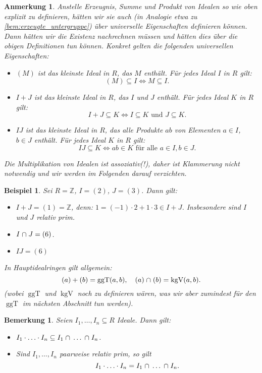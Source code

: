 \documentclass[a4paper, twoside, 11pt, ngerman]{report}
\newcommand{\ZZ}{\mathds Z}
\DeclareMathOperator{\ggT}{ggT}
\DeclareMathOperator{\kgV}{kgV}
\renewcommand{\cap}{\;\rotatebox{90}{\reflectbox{\rotatebox{270}{$\cup$}}}\;}
\theoremstyle{definistyle}
\newtheorem{bem}[satz]{Bemerkung}
\newtheorem{anm}[satz]{Anmerkung}
\newtheorem{bsp}[satz]{Beispiel}
\theoremstyle{remark}
\begin{document}
\begin{anm}\label{anm:kleinstes_ideal}
Anstelle Erzeugnis, Summe und Produkt von Idealen so wie oben explizit zu definieren,
hätten wir sie auch (in Analogie etwa zu \ref{bem:erzeugte_untergruppe}) über universelle Eigenschaften definieren können. Dann hätten wir die Existenz nachrechnen müssen und hätten dies
über die obigen Definitionen tun können. Konkret gelten die folgenden universellen Eigenschaften:
\begin{itemize}
    \item $(M)$ ist das kleinste Ideal in $R$, das $M$ enthält. Für jedes Ideal $I$ in $R$ gilt:
    \[(M) \subseteq I \iff M \subseteq I.\]
    \item $I + J$ ist das kleinste Ideal in $R$, das $I$ und $J$ enthält. Für jedes Ideal $K$ in $R$ gilt:
    \[I + J \subseteq K \iff I \subseteq K \text{ und } J \subseteq K.\]
    \item $I J$ ist das kleinste Ideal in $R$, das alle Produkte $ab$ von Elementen $a \in I$, $b \in J$ enthält.
    Für jedes Ideal $K$ in $R$ gilt:
    \[
    I J \subseteq K \iff ab \in K \text{ für alle } a \in I, b \in J.
    \]
\end{itemize}
Die Multiplikation von Idealen ist assoziativ(!), daher ist Klammerung nicht notwendig und wir werden im Folgenden darauf verzichten.
\end{anm}

\begin{bsp}\label{bsp:idealsummen_produkte}
Sei $R = \ZZ$, $I = (2)$, $J = (3)$. Dann gilt:
\begin{itemize}
    \item $I + J = (1) = \ZZ$, denn: $1 = (-1) \cdot 2 + 1 \cdot 3 \in I + J$. Insbesondere sind $I$ und $J$ relativ prim.
    \item $I \cap J = (6)$.
    \item $IJ=(6)$
\end{itemize}

In Hauptidealringen gilt allgemein:
\[
(a) + (b) = \ggT(a, b), \quad (a) \cap (b) = \kgV(a, b).
\]
(wobei $\ggT$ und $\kgV$ noch zu definieren wären, was wir aber zumindest für den $\ggT$ im nächsten Abschnitt tun werden).
\end{bsp}

\begin{bem}\label{bem:idealprodukte_durchschnitte}
Seien $I_1, \dots, I_n \subseteq R$ Ideale. Dann gilt:
\begin{itemize}
    \item[(a)] $I_1 \cdot\ldots\cdot I_n \subseteq I_1 \cap \dots \cap I_n$.
    \item[(b)] Sind $I_1, \dots, I_n$ paarweise relativ prim, so gilt
    \[
    I_1 \cdot\ldots\cdot I_n = I_1 \cap \dots \cap I_n.
    \]
\end{itemize}
\end{bem}
\end{document}

